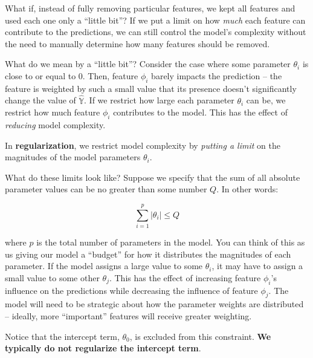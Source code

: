 \documentclass[
  letterpaper,
  DIV=11,
  numbers=noendperiod]{scrreprt}
\begin{document}
What if, instead of fully removing particular features, we kept all
features and used each one only a ``little bit''? If we put a limit on
how \emph{much} each feature can contribute to the predictions, we can
still control the model's complexity without the need to manually
determine how many features should be removed.

What do we mean by a ``little bit''? Consider the case where some
parameter \(\theta_i\) is close to or equal to 0. Then, feature
\(\phi_i\) barely impacts the prediction -- the feature is weighted by
such a small value that its presence doesn't significantly change the
value of \(\hat{\mathbb{Y}}\). If we restrict how large each parameter
\(\theta_i\) can be, we restrict how much feature \(\phi_i\) contributes
to the model. This has the effect of \emph{reducing} model complexity.

In \textbf{regularization}, we restrict model complexity by
\emph{putting a limit} on the magnitudes of the model parameters
\(\theta_i\).

What do these limits look like? Suppose we specify that the sum of all
absolute parameter values can be no greater than some number \(Q\). In
other words:

\[\sum_{i=1}^p |\theta_i| \leq Q\]

where \(p\) is the total number of parameters in the model. You can
think of this as us giving our model a ``budget'' for how it distributes
the magnitudes of each parameter. If the model assigns a large value to
some \(\theta_i\), it may have to assign a small value to some other
\(\theta_j\). This has the effect of increasing feature \(\phi_i\)'s
influence on the predictions while decreasing the influence of feature
\(\phi_j\). The model will need to be strategic about how the parameter
weights are distributed -- ideally, more ``important'' features will
receive greater weighting.

\begin{tcolorbox}[enhanced jigsaw, arc=.35mm, left=2mm, toprule=.15mm, leftrule=.75mm, bottomrule=.15mm, colframe=quarto-callout-note-color-frame, rightrule=.15mm, colbacktitle=quarto-callout-note-color!10!white, opacitybacktitle=0.6, coltitle=black, bottomtitle=1mm, colback=white, toptitle=1mm, title=\textcolor{quarto-callout-note-color}{\faInfo}\hspace{0.5em}{Note}, breakable, opacityback=0, titlerule=0mm]

Notice that the intercept term, \(\theta_0\), is excluded from this
constraint. \textbf{We typically do not regularize the intercept term}.

\end{tcolorbox}
\end{document}
